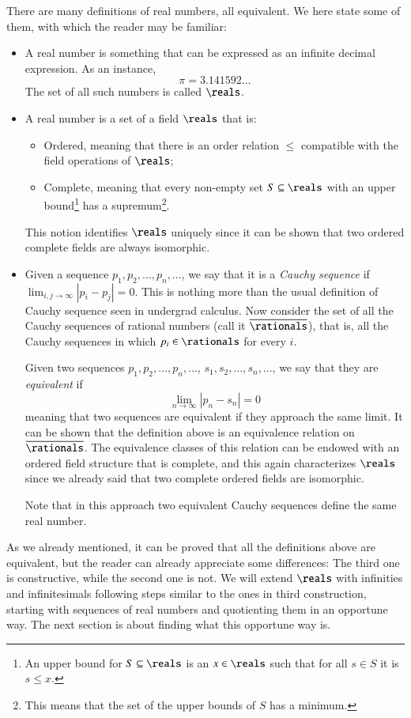 \documentclass[adraft, copyright,creativecommons,sharealike,noncommercial]{eptcs}
\begin{document}
There are many definitions of real numbers, all equivalent. We here state some of them, with which the reader may be familiar:
\begin{itemize}
	\item A real number is something that can be expressed as an infinite decimal expression. As an instance,
	\begin{equation*}
		\pi = 3.141592\dots
	\end{equation*}
	The set of all such numbers is called $\reals$.
	
	\item A real number is a set of a field $\reals$ that is:
	\begin{itemize}
		\item Ordered, meaning that there is an order relation $\leq$ compatible with the field operations of $\reals$;
		\item Complete, meaning that every non-empty set $S \subseteq \reals$ with an upper bound\footnote{An upper bound for $S \subseteq \reals$ is an $x \in \reals$ such that for all $s \in S$ it is $s \leq x$.} has a supremum\footnote{This means that the set of the upper bounds of $S$ has a minimum.}.
	\end{itemize}
	 This notion identifies $\reals$ uniquely since it can be shown that two ordered complete fields are always isomorphic.
	 
	 \item Given a sequence $p_1, p_2, \dots, p_n, \dots$, we say that it is a \emph{Cauchy sequence} if $\lim_{i,j \to \infty} | p_i - p_j | = 0$. This is nothing more than the usual definition of Cauchy sequence seen in undergrad calculus. Now consider the set of all the Cauchy sequences of rational numbers (call it $\overline{\rationals}$), that is, all the Cauchy sequences in which $p_i \in \rationals$ for every $i$. 
	 
	 Given two sequences $p_1, p_2, \dots, p_n, \dots$, $s_1, s_2, \dots, s_n, \dots$, we say that they are \emph{equivalent} if
	 \begin{equation*}
	 	\lim_{n \to \infty} |p_n - s_n | = 0
	 \end{equation*}
	 meaning that two sequences are equivalent if they approach the same limit. It can be shown that the definition above is an equivalence relation on $\overline{\rationals}$. The equivalence classes of this relation can be endowed with an ordered field structure that is complete, and this again characterizes $\reals$ since we already said that two complete ordered fields are isomorphic.
	 
	 Note that in this approach two equivalent Cauchy sequences define the same real number.
 \end{itemize}
As we already mentioned, it can be proved that all the definitions above are equivalent, but the reader can already appreciate some differences: The third one is constructive, while the second one is not. We will extend $\reals$ with infinities and infinitesimals following steps similar to the ones in third construction, starting with sequences of real numbers and quotienting them in an opportune way. The next section is about finding what this opportune way is.
\end{document}
